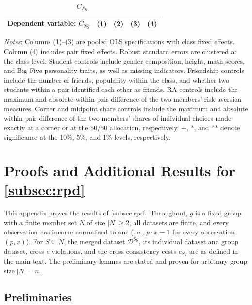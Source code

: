 \documentclass[11 pt]{article}
\begin{document}
\begin{table}[H]
\centering
\caption{$C_{Ng}$}
\label{tab:collective_cng}
\begin{tabular}{lcccc}
\toprule \hline
Dependent variable: $C_{Ng}$ & (1) & (2) & (3) & (4) \\ \midrule

\end{tabular}

\begin{minipage}{\textwidth}
{\footnotesize
\emph{Notes}:
Columns (1)--(3) are pooled OLS specifications with class fixed effects.
Column (4) includes pair fixed effects.
Robust standard errors are clustered at the class level.
Student controls include gender composition, height, math scores, and Big Five
personality traits, as well as missing indicators.
Friendship controls include the number of friends, popularity within the class,
and whether two students within a pair identified each other as friends.
RA controls include the maximum and absolute within-pair difference of the two
members' risk-aversion measures.
Corner and midpoint share controls include the maximum and absolute within-pair
difference of the two members' shares of individual choices made exactly at a
corner or at the 50/50 allocation, respectively.
+, *, and ** denote significance at the 10\%, 5\%, and 1\% levels, respectively.
}
\end{minipage}
\end{table}


\newpage

\section{Proofs and Additional Results for \autoref{subsec:rpd}}\label{appendix:rpd}

This appendix proves the results of \autoref{subsec:rpd}. Throughout, $g$ is a fixed group with a finite member set $N$ of size $| N | \geq 2$, all datasets are finite, and every observation has income normalized to one (i.e., $p \cdot x = 1$ for every observation $(p,x)$). For $S \subseteq N$, the merged dataset $\mathcal{D}^{Sg}$, its individual dataset and group dataset, cross $e$-violations, and the cross-consistency costs $c_{Sg}$ are as defined in the main text. The preliminary lemmas are stated and proven for arbitrary group size $|N| = n$.

\subsection{Preliminaries}\label{subsec:app_prelim}
\end{document}
